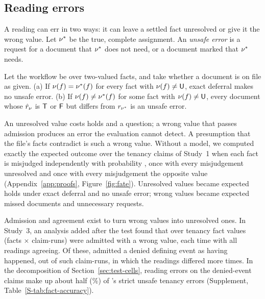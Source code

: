 \subsection{Reading errors}
\label{sec:fate}

A reading can err in two ways: it can leave a settled fact unresolved or give it the wrong value. Let $\nu^\ast$ be the true, complete assignment. An \emph{unsafe error} is a request for a document that $\nu^\ast$ does not need, or a document marked \skipd that $\nu^\ast$ needs.

\begin{proposition}
\label{prop:errors}
Let the workflow be over two-valued facts, and take whether a document is on file as given. (a) If $\nu(f)=\nu^\ast(f)$ for every fact with $\nu(f)\neq\mathsf{U}$, exact deferral makes no unsafe error. (b) If $\nu(f)\neq\nu^\ast(f)$ for some fact with $\nu(f)\neq\mathsf{U}$, every document whose $\hat r_\nu$ is $\mathsf{T}$ or $\mathsf{F}$ but differs from $r_{\nu^\ast}$ is an unsafe error.
\end{proposition}

An unresolved value costs holds and a question; a wrong value that passes admission produces an error the evaluation cannot detect. A presumption that the file's facts contradict is such a wrong value. Without a model, we computed exactly the expected outcome over the \propClaims{} tenancy claims of Study~1 when each fact is misjudged independently with probability \propEps, once with every misjudgement unresolved and once with every misjudgement the opposite value (Appendix~\ref{app:proofs}, Figure~\ref{fig:fate}). Unresolved values became expected holds under exact deferral and no unsafe error; wrong values became expected missed documents and unnecessary requests.

Admission and agreement exist to turn wrong values into unresolved ones. In Study~3, an analysis added after the test found that over \sthreeRThreeCasePathFactRuns{} tenancy fact values (facts $\times$ claim-runs) \sthreeRThreeCasePathAdmittedWrong{} were admitted with a wrong value, each time with all readings agreeing. Of these, \sthreeRThreeCasePathDeniedEventAdmWrong{} admitted a denied defining event as having happened, out of \sthreeRThreeCasePathDeniedEventN{} such claim-runs, in which the readings differed \sthreeRThreeCasePathDeniedEventConflicting{} more times. In the decomposition of Section~\ref{sec:test-cells}, reading errors on the denied-event claims make up about half (\spostDecTenLunaDeniedReadingSharePct\%) of \casepath's strict unsafe tenancy errors (Supplement, Table~\ref{S-tab:fact-accuracy}).
